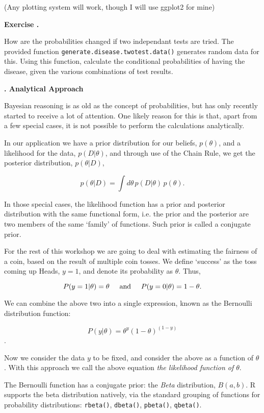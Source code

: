\documentclass[10pt, a4paper]{article}
\newcounter{wssection}
\newcounter{wsexercise}[wssection]
\newcommand{\worksheetsection}[1]{
\vspace{10mm}
\stepcounter{wssection}
\noindent \Large \textbf{\thewssection. #1} \normalsize
\vspace{3mm}
}
\newcommand{\worksheetexercise}{
\stepcounter{wsexercise}
\vspace{5mm} \noindent \textbf{Exercise \thewssection.\thewsexercise \;}
}
\begin{document}
(Any plotting system will work, though I will use ggplot2 for mine)


\worksheetexercise
How are the probabilities changed if two independant tests are
tried. The provided function \texttt{generate.disease.twotest.data()}
generates random data for this. Using this function, calculate the
conditional probabilities of having the disease, given the various
combinations of test results.



\worksheetsection{Analytical Approach}

\noindent
Bayesian reasoning is as old as the concept of probabilities, but has
only recently started to receive a lot of attention. One likely reason
for this is that, apart from a few special cases, it is not possible
to perform the calculations analytically.

In our application we have a prior distribution for our beliefs,
$p(\theta)$, and a likelihood for the data, $p(D | \theta)$, and
through use of the Chain Rule, we get the posterior distribution,
$p(\theta | D)$,

\[ p(\theta | D) = \int d\theta \, p(D | \theta) \, p(\theta).  \]

In those special cases, the likelihood function has a prior and
posterior distribution with the same functional form, i.e. the prior
and the posterior are two members of the same `family' of functions. 
Such prior is called a conjugate prior.

For the rest of this workshop we are going to deal with estimating the
fairness of a coin, based on the result of multiple coin tosses. We
define `success' as the toss coming up Heads, $y=1$, and denote its
probability as $\theta$. Thus,

\[ P(y = 1 | \theta) = \theta \hspace{5mm} \text{and} \hspace{5mm}
   P(y = 0 | \theta) = 1 - \theta. \]

\noindent
We can combine the above two into a single expression, known as the Bernoulli distribution function:

\[ P(y | \theta) = \theta^y (1 - \theta)^{(1 - y)} \].

Now we consider the data $y$ to be fixed, and consider the above as a
function of $\theta$. With this approach we call the above equation
\emph{the likelihood function of $\theta$}.

The Bernoulli function has a conjugate prior: the \emph{Beta}
distribution, $B(a, b)$. R supports the beta distribution natively,
via the standard grouping of functions for probability distributions:
\texttt{rbeta()}, \texttt{dbeta()}, \texttt{pbeta()}, \texttt{qbeta()}.
\end{document}
